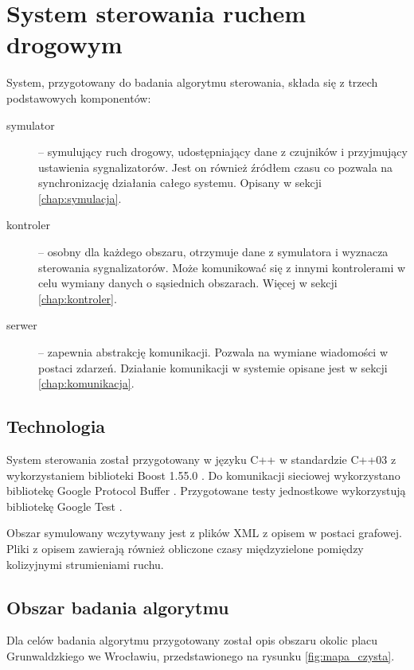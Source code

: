 \chapter{System sterowania ruchem drogowym}
System, przygotowany do badania algorytmu sterowania, składa się z trzech podstawowych komponentów:
\begin{description}
	\item[symulator] --
		symulujący ruch drogowy, udostępniający dane z czujników i przyjmujący ustawienia sygnalizatorów.
		Jest on również źródłem czasu co pozwala na synchronizację działania całego systemu. Opisany w sekcji \ref{chap:symulacja}.
	\item[kontroler] --
		osobny dla każdego obszaru, otrzymuje dane z symulatora i wyznacza sterowania sygnalizatorów.
		Może komunikować się z innymi kontrolerami w celu wymiany danych o sąsiednich obszarach. Więcej w sekcji \ref{chap:kontroler}.
	\item[serwer] --
		zapewnia abstrakcję komunikacji. Pozwala na wymiane wiadomości w postaci zdarzeń.
		Działanie komunikacji w systemie opisane jest w sekcji \ref{chap:komunikacja}.
\end{description}

\section{Technologia}
System sterowania został przygotowany w języku C++ w standardzie C++03 z wykorzystaniem biblioteki Boost 1.55.0 \cite{boost}. Do komunikacji sieciowej wykorzystano bibliotekę Google Protocol Buffer \cite{protobuf}. Przygotowane testy jednostkowe wykorzystują bibliotekę Google Test \cite{gtest}.

Obszar symulowany wczytywany jest z plików XML z opisem w postaci grafowej. Pliki z opisem zawierają również obliczone czasy międzyzielone pomiędzy kolizyjnymi strumieniami ruchu.

\section{Obszar badania algorytmu}
Dla celów badania algorytmu przygotowany został opis obszaru okolic placu Grunwaldzkiego we Wrocławiu, przedstawionego na rysunku \ref{fig:mapa_czysta}.

